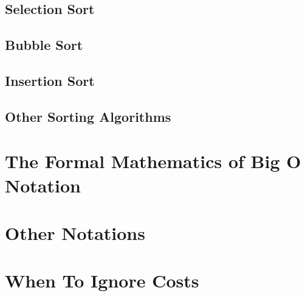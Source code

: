 \subsection{Selection Sort}



\subsection{Bubble Sort}
\subsection{Insertion Sort}
\subsection{Other Sorting Algorithms}


\section{The Formal Mathematics of Big O Notation}
\section{Other Notations}


\section{When To Ignore Costs}